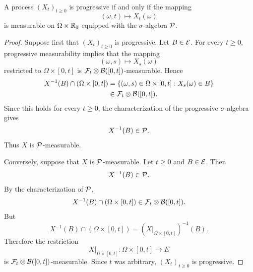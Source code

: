 \begin{proposition} \label{chap3.1:proposition-progressivity_from_sigma_algebra_characterization}
 \\
A process $(X_t)_{t \geq 0}$ is progressive if and only if the mapping 
$$(\omega,t) \mapsto X_t(\omega)$$
is measurable on $\Omega \times \mathbb{R}_0$ equipped with the $\sigma$-algebra $\mathcal{P}$.
\end{proposition}
\begin{proof}
Suppose first that $(X_t)_{t\geq0}$ is progressive. Let
$B\in\mathcal{E}$. For every $t\geq0$, progressive measurability implies that
the mapping
$$
(\omega,s)\mapsto X_s(\omega)
$$
restricted to $\Omega\times[0,t]$ is
$\mathcal{F}_t\otimes\mathcal{B}([0,t])$-measurable. Hence
$$
\begin{aligned}
X^{-1}(B)\cap(\Omega\times[0,t])
&=
\{(\omega,s)\in\Omega\times[0,t]:X_s(\omega)\in B\}\\
&\in
\mathcal{F}_t\otimes\mathcal{B}([0,t]).
\end{aligned}
$$
Since this holds for every $t\geq0$, the characterization of the
progressive $\sigma$-algebra gives
$$
X^{-1}(B)\in\mathcal{P}.
$$
Thus $X$ is $\mathcal{P}$-measurable.

Conversely, suppose that $X$ is $\mathcal{P}$-measurable. Let $t\geq0$ and
$B\in\mathcal{E}$. Then
$$
X^{-1}(B)\in\mathcal{P}.
$$
By the characterization of $\mathcal{P}$,
$$
X^{-1}(B)\cap(\Omega\times[0,t])
\in
\mathcal{F}_t\otimes\mathcal{B}([0,t]).
$$
But
$$
X^{-1}(B)\cap(\Omega\times[0,t])
=
(X|_{\Omega\times[0,t]})^{-1}(B).
$$
Therefore the restriction
$$
X|_{\Omega\times[0,t]}
:
\Omega\times[0,t]\to E
$$
is $\mathcal{F}_t\otimes\mathcal{B}([0,t])$-measurable. Since $t$ was arbitrary,
$(X_t)_{t\geq0}$ is progressive.
\end{proof}

